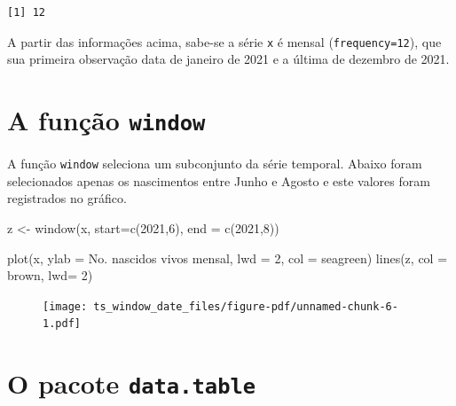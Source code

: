 \documentclass[
  letterpaper,
  DIV=11,
  numbers=noendperiod]{scrreprt}
\newenvironment{Shaded}{\begin{snugshade}}{\end{snugshade}}
\newcommand{\AttributeTok}[1]{\textcolor[rgb]{0.40,0.45,0.13}{#1}}
\newcommand{\DecValTok}[1]{\textcolor[rgb]{0.68,0.00,0.00}{#1}}
\newcommand{\FunctionTok}[1]{\textcolor[rgb]{0.28,0.35,0.67}{#1}}
\newcommand{\NormalTok}[1]{\textcolor[rgb]{0.00,0.23,0.31}{#1}}
\newcommand{\OtherTok}[1]{\textcolor[rgb]{0.00,0.23,0.31}{#1}}
\newcommand{\StringTok}[1]{\textcolor[rgb]{0.13,0.47,0.30}{#1}}
\theoremstyle{definition}
\theoremstyle{plain}
\theoremstyle{definition}
\theoremstyle{plain}
\theoremstyle{remark}
\begin{document}
\begin{verbatim}
[1] 12
\end{verbatim}

A partir das informações acima, sabe-se a série \texttt{x} é mensal
(\texttt{frequency=12}), que sua primeira observação data de janeiro de
2021 e a última de dezembro de 2021.

\hypertarget{a-funuxe7uxe3o-window}{%
\section{\texorpdfstring{A função
\texttt{window}}{A função window}}\label{a-funuxe7uxe3o-window}}

A função \texttt{window} seleciona um subconjunto da série temporal.
Abaixo foram selecionados apenas os nascimentos entre Junho e Agosto e
este valores foram registrados no gráfico.

\begin{Shaded}
\begin{Highlighting}[]
\NormalTok{z }\OtherTok{\textless{}{-}} \FunctionTok{window}\NormalTok{(x, }\AttributeTok{start=}\FunctionTok{c}\NormalTok{(}\DecValTok{2021}\NormalTok{,}\DecValTok{6}\NormalTok{), }\AttributeTok{end =} \FunctionTok{c}\NormalTok{(}\DecValTok{2021}\NormalTok{,}\DecValTok{8}\NormalTok{))}

\FunctionTok{plot}\NormalTok{(x, }\AttributeTok{ylab =} \StringTok{\textquotesingle{}No. nascidos vivos mensal\textquotesingle{}}\NormalTok{, }\AttributeTok{lwd =} \DecValTok{2}\NormalTok{, }\AttributeTok{col =} \StringTok{\textquotesingle{}seagreen\textquotesingle{}}\NormalTok{)}
\FunctionTok{lines}\NormalTok{(z, }\AttributeTok{col =} \StringTok{\textquotesingle{}brown\textquotesingle{}}\NormalTok{, }\AttributeTok{lwd=} \DecValTok{2}\NormalTok{)}
\end{Highlighting}
\end{Shaded}

\begin{figure}[H]

{\centering \texttt{[image: ts\_window\_date\_files/figure-pdf/unnamed-chunk-6-1.pdf]}

}

\end{figure}

\hypertarget{o-pacote-data.table}{%
\section{\texorpdfstring{O pacote
\texttt{data.table}}{O pacote data.table}}\label{o-pacote-data.table}}
\end{document}
